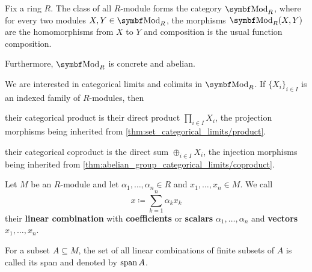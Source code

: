 \begin{definition}\label{def:category_of_modules}
  Fix a ring \( R \). The class of all \( R \)-module forms the category \( \Bold{Mod}_R \), where for every two modules \( X, Y \in \Bold{Mod}_R \), the morphisms \( \Bold{Mod}_R(X, Y) \) are the homomorphisms from \( X \) to \( Y \) and composition is the usual function composition.

  Furthermore, \( \Bold{Mod}_R \) is concrete and abelian.
\end{definition}

\begin{proposition}\label{thm:module_categorical_limits}
  We are interested in categorical limits and colimits in \( \Bold{Mod}_R \). If \( \{ X_i \}_{i \in I} \) is an indexed family of \( R \)-modules, then
  \begin{defenum}
     their categorical product is their direct product \( \prod_{i \in I} X_i \), the projection morphisms being inherited from \cref{thm:set_categorical_limits/product}.

     their categorical coproduct is the direct sum \( \oplus_{i \in I} X_i \), the injection morphisms being inherited from \cref{thm:abelian_group_categorical_limits/coproduct}.
  \end{defenum}
\end{proposition}

\begin{definition}\label{def:linear_combination}
  Let \( M \) be an \( R \)-module and let \( \alpha_1, \ldots, \alpha_n \in R \) and \( x_1, \ldots, x_n \in M \). We call
  \begin{equation*}
    x \coloneqq \sum_{k=1}^n \alpha_k x_k
  \end{equation*}
  their \textbf{linear combination} with \textbf{coefficients} or \textbf{scalars} \( \alpha_1, \ldots, \alpha_n \) and \textbf{vectors} \( x_1, \ldots, x_n \).

  For a subset \( A \subseteq M \), the set of all linear combinations of finite subsets of \( A \) is called its span and denoted by \( \operatorname{span}{A} \).
\end{definition}

